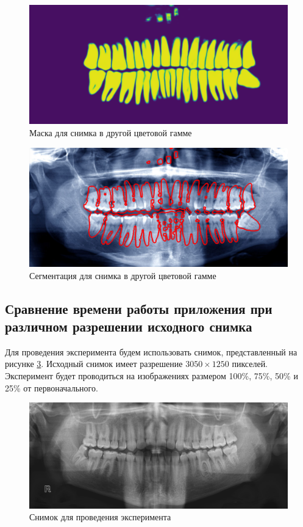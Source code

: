 \begin{figure}[H]
	\centering
	\includegraphics[width=\textwidth]{img/predicted3.png}
	\caption{Маска для снимка в другой цветовой гамме}
	\label{fig:predicted3}
\end{figure}

\begin{figure}[H]
	\centering
	\includegraphics[width=\textwidth]{img/segmented3.png}
	\caption{Сегментация для снимка в другой цветовой гамме}
	\label{fig:segmented3}
\end{figure}

\subsection{Сравнение времени работы приложения при различном разрешении исходного снимка}

Для проведения эксперимента будем использовать снимок, представленный на рисунке \ref{fig:training}. Исходный снимок имеет разрешение $3050 \times 1250$ пикселей. Эксперимент будет проводиться на изображениях размером 100\%, 75\%, 50\% и 25\% от первоначального.

\begin{figure}[H]
	\centering
	\includegraphics[width=\textwidth]{img/training.png}
	\caption{Снимок для проведения эксперимента}
	\label{fig:training}
\end{figure}

